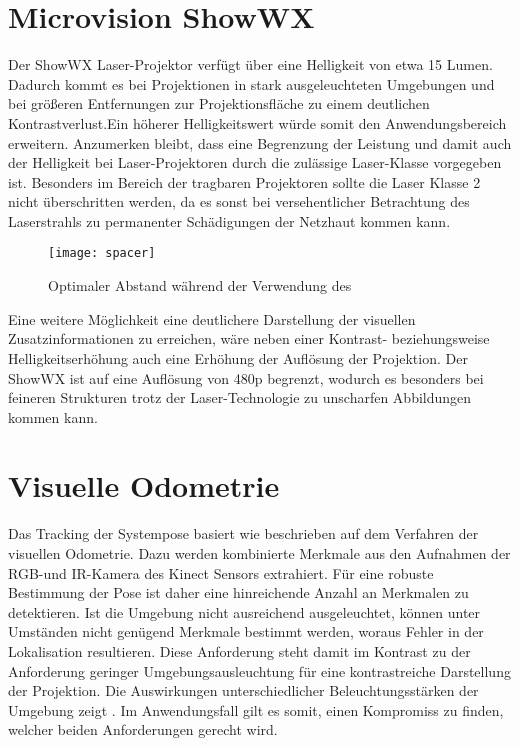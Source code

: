 \section{Microvision ShowWX}
Der ShowWX Laser-Projektor verfügt über eine Helligkeit von etwa 15 Lumen. Dadurch kommt es bei Projektionen in stark ausgeleuchteten Umgebungen und bei größeren Entfernungen zur Projektionsfläche zu einem deutlichen Kontrastverlust.\red[ Bild?] Ein höherer Helligkeitswert würde somit den Anwendungsbereich erweitern. Anzumerken bleibt, dass eine Begrenzung der Leistung und damit auch der Helligkeit bei Laser-Projektoren durch die zulässige Laser-Klasse vorgegeben ist. Besonders im Bereich der tragbaren Projektoren sollte die Laser Klasse 2 nicht überschritten werden, da es sonst bei versehentlicher Betrachtung des Laserstrahls zu permanenter Schädigungen der Netzhaut kommen kann.\\

\begin{figure}[!ht]
	\begin{center}
		\texttt{[image: spacer]}
		\caption{Optimaler Abstand während der Verwendung des }
		\label{fig.optdist}
	\end{center}
\end{figure}

Eine weitere Möglichkeit eine deutlichere Darstellung der visuellen Zusatzinformationen zu erreichen, wäre neben einer Kontrast- beziehungsweise Helligkeitserhöhung auch eine Erhöhung der Auflösung der Projektion. Der ShowWX ist auf eine Auflösung von 480p begrenzt, wodurch es besonders bei feineren Strukturen trotz der Laser-Technologie zu unscharfen Abbildungen kommen kann.\\

\section{Visuelle Odometrie}
Das Tracking der Systempose basiert wie beschrieben auf dem Verfahren der visuellen Odometrie. Dazu werden kombinierte Merkmale aus den Aufnahmen der RGB-und IR-Kamera des Kinect Sensors extrahiert. Für eine robuste Bestimmung der Pose ist daher eine hinreichende Anzahl an Merkmalen zu detektieren. Ist die Umgebung nicht ausreichend ausgeleuchtet, können unter Umständen nicht genügend Merkmale bestimmt werden, woraus Fehler in der Lokalisation resultieren. Diese Anforderung steht damit im Kontrast zu der Anforderung geringer Umgebungsausleuchtung für eine kontrastreiche Darstellung der Projektion. Die Auswirkungen unterschiedlicher Beleuchtungsstärken der Umgebung zeigt . Im Anwendungsfall gilt es somit, einen Kompromiss zu finden, welcher beiden Anforderungen gerecht wird. 


